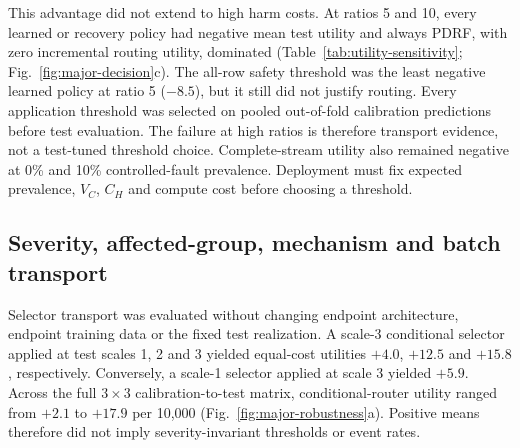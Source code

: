 \documentclass[11pt]{article}
\begin{document}
This advantage did not extend to high harm costs. At ratios 5 and 10, every learned or recovery policy had negative mean test utility and always PDRF, with zero incremental routing utility, dominated (Table~\ref{tab:utility-sensitivity}; Fig.~\ref{fig:major-decision}c). The all-row safety threshold was the least negative learned policy at ratio 5 ($-8.5$), but it still did not justify routing. Every application threshold was selected on pooled out-of-fold calibration predictions before test evaluation. The failure at high ratios is therefore transport evidence, not a test-tuned threshold choice. Complete-stream utility also remained negative at 0\% and 10\% controlled-fault prevalence. Deployment must fix expected prevalence, $V_C$, $C_H$ and compute cost before choosing a threshold.

\begin{table}[ht]
\centering
\caption{\textbf{Fitted-pair dispersion of utility-selected analytical controls.} Each row first pools the four fixed mechanisms within each of 10 fitted endpoint pairs. Utilities are units per 10,000 strict observations with $V_C=1$, $\lambda=0$ and the indicated harm ratio. Test values are mean [95\% Student-$t$ interval] and median [interquartile range]. ``Test$-$cal.'' compares fixed-test utility with utility on pooled out-of-fold calibration predictions. Positive counts denote fitted pairs with test utility above zero. Because decision-event denominators are pooled within fitted pair before averaging, decision percentages can differ slightly from the equal-weight mechanism--pair means in Table~\ref{tab:lite-main}.}
\label{tab:utility-sensitivity}
\scriptsize
\resizebox{\textwidth}{!}{}
\end{table}

\subsection{Severity, affected-group, mechanism and batch transport}

Selector transport was evaluated without changing endpoint architecture, endpoint training data or the fixed test realization. A scale-3 conditional selector applied at test scales 1, 2 and 3 yielded equal-cost utilities $+4.0$, $+12.5$ and $+15.8$, respectively. Conversely, a scale-1 selector applied at scale 3 yielded $+5.9$. Across the full $3\times3$ calibration-to-test matrix, conditional-router utility ranged from $+2.1$ to $+17.9$ per 10,000 (Fig.~\ref{fig:major-robustness}a). Positive means therefore did not imply severity-invariant thresholds or event rates.
\end{document}
